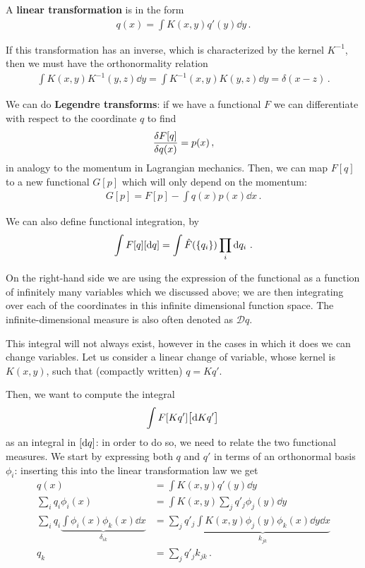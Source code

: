\documentclass[main.tex]{subfiles}
\begin{document}
A \textbf{linear transformation} is in the form 
%
\begin{align}
q(x) = \int K(x, y) q'(y) \dd{y}
\,.
\end{align}

If this transformation has an inverse, which is characterized by the kernel \(K^{-1}\), then we must have the orthonormality relation 
%
\begin{align}
\int K(x,y) K^{-1} (y, z) \dd{y} =
\int K^{-1}(x,y) K (y, z) \dd{y} =
\delta (x-z)
\,.
\end{align}

We can do \textbf{Legendre transforms}: if we have a functional \(F\) we can differentiate with respect to the coordinate \(q\) to find 
%
\begin{align}
\fdv{F[q]}{q(x)} = p(x)
\,,
\end{align}
%
in analogy to the momentum in Lagrangian mechanics. Then, we can map \(F[q]\) to a new functional \(G[p]\) which will only depend on the momentum: 
%
\begin{align}
G[p]= F[p] - \int q(x) p(x) \dd{x}
\,.
\end{align}

We can also define functional integration, by 
%
\begin{align}
\int F[q] \qty[ \dd{q}] = \int \hat{F}(\qty{q_i}) \prod_i \dd{q_i}
\,.
\end{align}

On the right-hand side we are using the expression of the functional as a function of infinitely many variables which we discussed above;
we are then integrating over each of the coordinates in this infinite dimensional function space.
The infinite-dimensional measure is also often denoted as \(\mathcal{D}q\). 

This integral will not always exist, however in the cases in which it does we can change variables. 
Let us consider a linear change of variable, whose kernel is \(K(x, y)\), such that (compactly written) \(q = K q'\). 

Then, we want to compute the integral 
%
\begin{align}
\int F[Kq'] \qty[ \dd{Kq'}] 
\,
\end{align}
%
as an integral in \(\qty[ \dd{q}]\): in order to do so, we need to relate the two functional measures. 
We start by expressing both \(q\) and \(q'\) in terms of an orthonormal basis \(\phi _i\): inserting this into the linear transformation law we get 
%
\begin{align}
q(x) &= \int K(x, y) q'(y) \dd{y}  \\
\sum _{i} q_i \phi _i(x) &= \int K(x, y) \sum _{j} q'_j \phi _j (y) \dd{y}  \\
\sum _{i} q_i \underbrace{\int \phi _i (x) \phi _k (x) \dd{x}}_{ \delta_{ik}} 
&= 
\sum _{j} q'_j \underbrace{\int K(x, y) \phi _j (y) \phi _k (x) \dd{y} \dd{x}}_{ k_{jk}}  \\
q_k &= \sum _{j} q'_j k_{jk}
\,.
\end{align}
\end{document}
